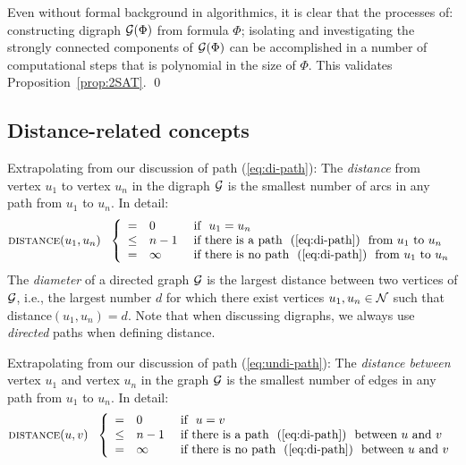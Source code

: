 \medskip

Even without formal background in algorithmics, it is clear that the
processes of: constructing digraph $\mbox{$\cal G$}(\Phi)$ from formula $\Phi$;
isolating and investigating the strongly connected components of
$\mbox{$\cal G$}(\Phi)$ can be accomplished in a number of computational steps that
is polynomial in the size of $\Phi$.  This validates
Proposition~\ref{prop:2SAT}.  \qed



\subsection{Distance-related concepts}

Extrapolating from our discussion of path (\ref{eq:di-path}): The {\it
  distance} from vertex $u_1$ to vertex $u_n$ in the digraph $\mbox{$\cal G$}$ is the
smallest number of arcs in any path from $u_1$ to $u_n$.  In detail:
\begin{equation}
\label{eq:di-distance-defn}
 \mbox{\sc distance}(u_1, u_n) \ \ \left\{
\begin{array}{cll}
= & 0 & \mbox{  if  } \ u_1 = u_n \\
\leq & n-1 & \mbox{  if there is a path } \ (\ref{eq:di-path})
\ \mbox{ from $u_1$ to $u_n$} \\
= & \infty & \mbox{  if there is no path } \ (\ref{eq:di-path})
\ \mbox{ from $u_1$ to $u_n$}
\end{array}
\right.
\end{equation}
The {\it diameter} 
 of a directed graph $\mbox{$\cal G$}$ is the largest
distance between two vertices of $\mbox{$\cal G$}$, i.e., the largest number $d$ for
which there exist vertices $u_1, u_n \in \mbox{$\cal N$}$ such that {\sc
  distance}$(u_1, u_n) = d$.  Note that when discussing digraphs, we
always use {\em directed} paths when defining distance.
\medskip

Extrapolating from our discussion of path (\ref{eq:undi-path}): The
{\it distance between} vertex $u_1$ and vertex $u_n$ in the graph $\mbox{$\cal G$}$ is
the smallest number of edges in any path from $u_1$ to $u_n$.  In
detail:
\begin{equation}
\label{eq:distance-defn}
 \mbox{\sc distance}(u, v) \ \ \left\{
\begin{array}{cll}
= & 0 & \mbox{  if  } \ u = v \\
\leq & n-1 & \mbox{  if there is a path } \ (\ref{eq:di-path})
\ \mbox{ between $u$ and $v$} \\
= & \infty & \mbox{  if there is no path } \ (\ref{eq:di-path})
\ \mbox{ between $u$ and $v$}
\end{array}
\right.
\end{equation}

